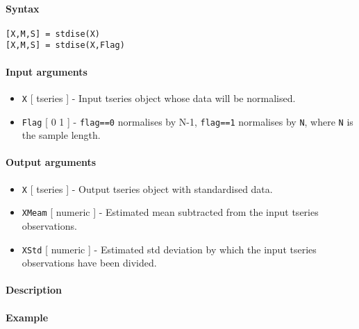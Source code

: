 


	\paragraph{Syntax}

\begin{verbatim}
[X,M,S] = stdise(X)
[X,M,S] = stdise(X,Flag)
\end{verbatim}

\paragraph{Input arguments}

\begin{itemize}
\item
  \texttt{X} {[} tseries {]} - Input tseries object whose data will be
  normalised.
\item
  \texttt{Flag} {[} 0 \textbar{} 1 {]} - \texttt{flag==0} normalises by
  N-1, \texttt{flag==1} normalises by \texttt{N}, where \texttt{N} is
  the sample length.
\end{itemize}

\paragraph{Output arguments}

\begin{itemize}
\item
  \texttt{X} {[} tseries {]} - Output tseries object with standardised
  data.
\item
  \texttt{XMeam} {[} numeric {]} - Estimated mean subtracted from the
  input tseries observations.
\item
  \texttt{XStd} {[} numeric {]} - Estimated std deviation by which the
  input tseries observations have been divided.
\end{itemize}

\paragraph{Description}

\paragraph{Example}


